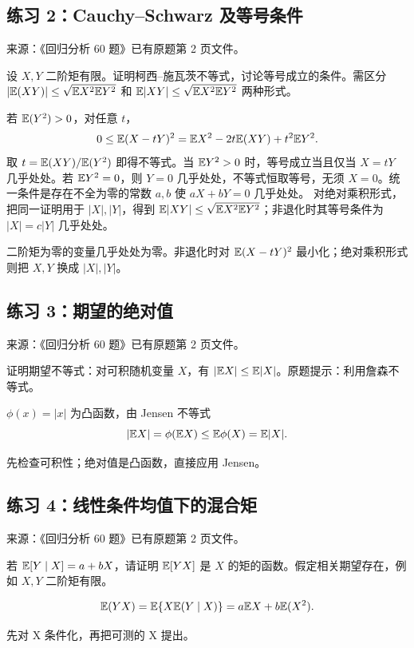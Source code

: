 \subsection*{练习 2：Cauchy--Schwarz 及等号条件}
\begin{homework}[练习 2]
\textsf{来源：《回归分析 60 题》已有原题第 2 页文件。}\par
设 $X,Y$ 二阶矩有限。证明柯西--施瓦茨不等式，讨论等号成立的条件。需区分 $|\mathbb{E}(XY)|\leq\sqrt{\mathbb{E} X^2\mathbb{E} Y^2}$ 和 $\mathbb{E}|XY|\leq\sqrt{\mathbb{E} X^2\mathbb{E} Y^2}$ 两种形式。
\end{homework}
\begin{solution}
若 $\mathbb{E}(Y^2)>0$，对任意 $t$，
\[
0\leq \mathbb{E}(X-tY)^2
=\mathbb{E} X^2-2t\mathbb{E}(XY)+t^2\mathbb{E} Y^2.
\]
取 $t=\mathbb{E}(XY)/\mathbb{E}(Y^2)$ 即得不等式。当 $\mathbb{E} Y^2>0$ 时，等号成立当且仅当 $X=tY$ 几乎处处。若 $\mathbb{E} Y^2=0$，则 $Y=0$ 几乎处处，不等式恒取等号，无须 $X=0$。统一条件是存在不全为零的常数 $a,b$ 使 $aX+bY=0$ 几乎处处。
对绝对乘积形式，把同一证明用于 $|X|,|Y|$，得到 $\mathbb{E}|XY|\leq\sqrt{\mathbb{E} X^2\mathbb{E} Y^2}$；非退化时其等号条件为 $|X|=c|Y|$ 几乎处处。
\end{solution}
\begin{dxtips}\label{hw:reg:tip:2}
二阶矩为零的变量几乎处处为零。非退化时对 $\mathbb{E}(X-tY)^2$ 最小化；绝对乘积形式则把 $X,Y$ 换成 $|X|,|Y|$。
\end{dxtips}

\subsection*{练习 3：期望的绝对值}
\begin{homework}[练习 3]
\textsf{来源：《回归分析 60 题》已有原题第 2 页文件。}\par
证明期望不等式：对可积随机变量 $X$，有 $|\mathbb{E} X|\leq\mathbb{E}|X|$。原题提示：利用詹森不等式。
\end{homework}
\begin{solution}
$\phi(x)=|x|$ 为凸函数，由 Jensen 不等式
\[
|\mathbb{E} X|=\phi(\mathbb{E} X)\leq\mathbb{E}\phi(X)=\mathbb{E}|X|.
\]
\end{solution}
\begin{dxtips}[期望的绝对值]\label{hw:reg:tip:3}
先检查可积性；绝对值是凸函数，直接应用 Jensen。
\end{dxtips}

\subsection*{练习 4：线性条件均值下的混合矩}
\begin{homework}[练习 4]
\textsf{来源：《回归分析 60 题》已有原题第 2 页文件。}\par
若 $\mathbb{E}[Y\mid X]=a+bX$，请证明 $\mathbb{E}[YX]$ 是 $X$ 的矩的函数。假定相关期望存在，例如 $X,Y$ 二阶矩有限。
\end{homework}
\begin{solution}
\[
\mathbb{E}(YX)=\mathbb{E}\{X\mathbb{E}(Y\mid X)\}
=a\mathbb{E} X+b\mathbb{E}(X^2).
\]
\end{solution}
\begin{dxtips}[线性条件均值下的混合矩]\label{hw:reg:tip:4}
先对 X 条件化，再把可测的 X 提出。
\end{dxtips}

